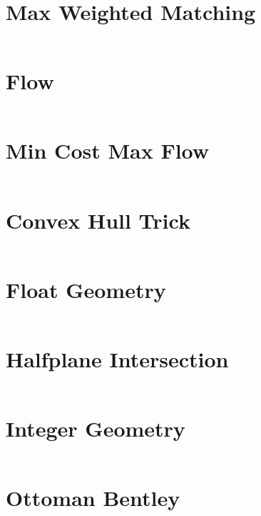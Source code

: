 \documentclass[12pt,english]{article}
\begin{document}
\section{Max Weighted Matching}
\inputminted[autogobble,breaklines,mathescape,linenos,numbersep=5pt,xleftmargin=0pt,fontsize=\footnotesize]{cpp}{codes/max_weighted_matching.tex}

\section{Flow}
\inputminted[autogobble,breaklines,mathescape,linenos,numbersep=5pt,xleftmargin=0pt,fontsize=\footnotesize]{cpp}{codes/flow.tex}

\section{Min Cost Max Flow}
\inputminted[autogobble,breaklines,mathescape,linenos,numbersep=5pt,xleftmargin=0pt,fontsize=\footnotesize]{cpp}{codes/mcmf.tex}

\section{Convex Hull Trick}
\inputminted[autogobble,breaklines,mathescape,linenos,numbersep=5pt,xleftmargin=0pt,fontsize=\footnotesize]{cpp}{codes/cht.tex}

\section{Float Geometry}
\inputminted[autogobble,breaklines,mathescape,linenos,numbersep=5pt,xleftmargin=0pt,fontsize=\footnotesize]{cpp}{codes/geometry_float.tex}

\section{Halfplane Intersection}
\inputminted[autogobble,breaklines,mathescape,linenos,numbersep=5pt,xleftmargin=0pt,fontsize=\footnotesize]{cpp}{codes/half_plane.tex}

\section{Integer Geometry}
\inputminted[autogobble,breaklines,mathescape,linenos,numbersep=5pt,xleftmargin=0pt,fontsize=\footnotesize]{cpp}{codes/geometry_int.tex}

\section{Ottoman Bentley}
\inputminted[autogobble,breaklines,mathescape,linenos,numbersep=5pt,xleftmargin=0pt,fontsize=\footnotesize]{cpp}{codes/ottoman_bentley.tex}
\end{document}
